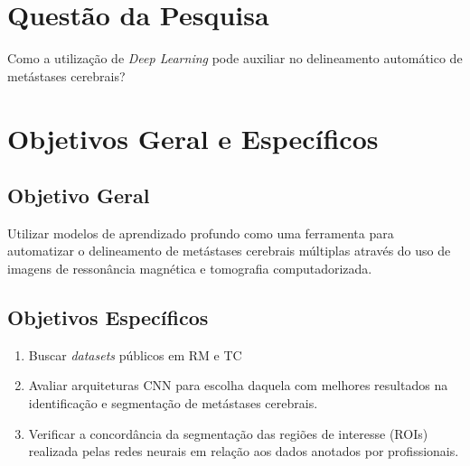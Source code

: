 \section{Questão da Pesquisa}

Como a utilização de \textit{Deep Learning} pode auxiliar no delineamento automático de metástases cerebrais?

\section{Objetivos Geral e Específicos}

\subsection{Objetivo Geral}

Utilizar modelos de aprendizado profundo como uma ferramenta para automatizar o delineamento de metástases cerebrais múltiplas através do uso de imagens de ressonância magnética e tomografia computadorizada.

\subsection{Objetivos Específicos}

\begin{enumerate}[I]
    \item Buscar \textit{datasets} públicos em RM e TC 
    \item Avaliar arquiteturas CNN para escolha daquela com melhores resultados na identificação e segmentação de metástases cerebrais.
    \item Verificar a concordância da segmentação das regiões de interesse (ROIs) realizada pelas redes neurais em relação aos dados anotados por profissionais.
\end{enumerate}
